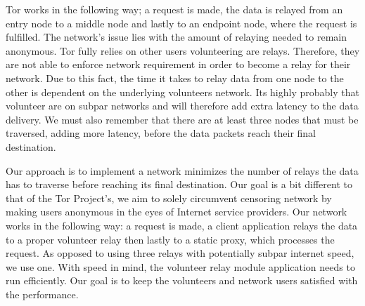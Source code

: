 \documentclass[12pt,a4paper]{report}
\begin{document}
Tor works in the following way; a request is made, the data is relayed from an entry node to a middle node and lastly to an endpoint node, where the request is fulfilled. The network's issue lies with the amount of relaying needed to remain anonymous. Tor fully relies on other users volunteering are relays. Therefore, they are not able to enforce network requirement in order to become a relay for their network. Due to this fact, the time it takes to relay data from one node to the other is dependent on the underlying volunteers network. Its highly probably that volunteer are on subpar networks and will therefore add extra latency to the data delivery. We must also remember that there are at least three nodes that must be traversed, adding more latency, before the data packets reach their final destination. 

Our approach is to implement a network minimizes the number of relays the data has to traverse before reaching its final destination. Our goal is a bit different to that of the Tor Project's, we aim to solely circumvent censoring network by making users anonymous in the eyes of Internet service providers. Our network works in the following way: a request is made, a client application relays the data to a proper volunteer relay then lastly to a static proxy, which processes the request. As opposed to using three relays with potentially subpar internet speed, we use one. With speed in mind, the volunteer relay module application needs to run efficiently. Our goal is to keep the volunteers and network users satisfied with the performance. 
\end{document}
